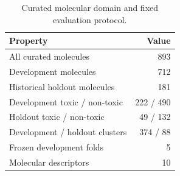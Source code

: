 \begin{table}[t]
\caption{Curated molecular domain and fixed evaluation protocol.}
\label{tab:data}
\centering
\begin{tabular}{lr}
\toprule
Property & Value \\
\midrule
All curated molecules & 893 \\
Development molecules & 712 \\
Historical holdout molecules & 181 \\
Development toxic / non-toxic & 222 / 490 \\
Holdout toxic / non-toxic & 49 / 132 \\
Development / holdout clusters & 374 / 88 \\
Frozen development folds & 5 \\
Molecular descriptors & 10 \\
\bottomrule
\end{tabular}
\end{table}
